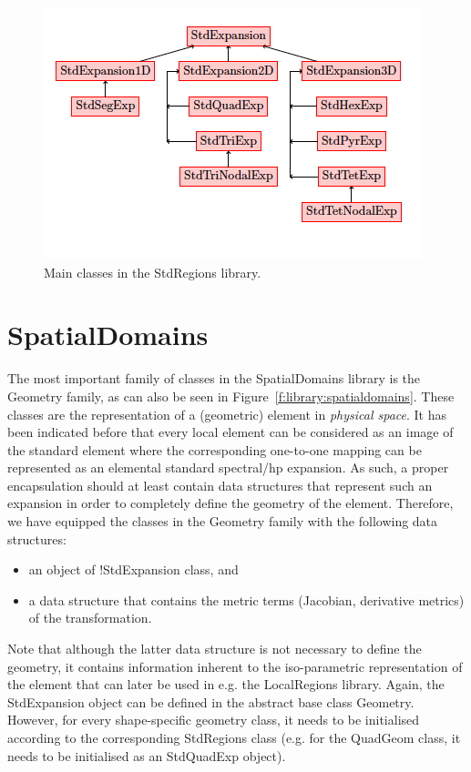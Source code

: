 \begin{figure}
\centering
\includegraphics[width=\textwidth]{img/StdRegions.png}
\caption{Main classes in the StdRegions library.}
\label{f:library:stdregions}
\end{figure}

\section{SpatialDomains}
The most important family of classes in the SpatialDomains library is the
Geometry family, as can also be seen in Figure~\ref{f:library:spatialdomains}.
These classes are the representation of a (geometric) element in \emph{physical
space}. It has been indicated before that every local element can be considered
as an image of the standard element where the corresponding one-to-one mapping
can be represented as an elemental standard spectral/hp expansion. As such, a
proper encapsulation should at least contain data structures that represent such
an expansion in order to completely define the geometry of the element.
Therefore, we have equipped the classes in the Geometry family with the
following data structures:

\begin{itemize}
\item an object of !StdExpansion class, and
\item a data structure that contains the metric terms (Jacobian, derivative
  metrics) of the transformation.
\end{itemize}

Note that although the latter data structure is not necessary to define the 
geometry, it contains information inherent to the iso-parametric representation
of the element that can later be used in e.g. the LocalRegions library. Again,
the StdExpansion object can be defined in the abstract base class Geometry. 
However, for every shape-specific geometry class, it needs to be initialised 
according to the corresponding StdRegions class (e.g. for the QuadGeom class, 
it needs to be initialised as an StdQuadExp object).

